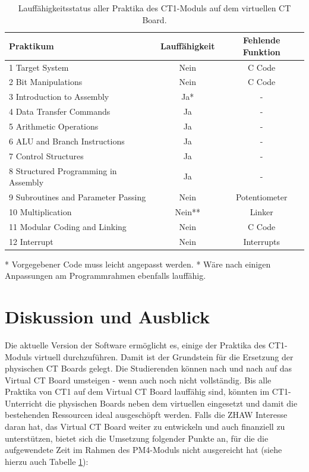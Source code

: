 \documentclass[10pt]{article}
\begin{document}
\begin{table}[ht]
\begin{tabular}{ | l | c | c |}
	\hline
    \textbf{Praktikum} & \textbf{Lauffähigkeit} & \textbf{Fehlende Funktion} \\
	\hline
    1 Target System & Nein & C Code \\
	\hline
    2 Bit Manipulations & Nein & C Code \\
\hline
    3 Introduction to Assembly & Ja* & - \\
\hline
    4 Data Transfer Commands & Ja & - \\
\hline
    5 Arithmetic Operations & Ja & - \\
\hline
    6 ALU and Branch Instructions & Ja & - \\
\hline
    7 Control Structures & Ja & - \\
\hline
    8 Structured Programming in Assembly & Ja & - \\
\hline
    9 Subroutines and Parameter Passing & Nein & Potentiometer \\
\hline
    10 Multiplication & Nein** & Linker \\
\hline
    11 Modular Coding and Linking & Nein & C Code \\
\hline
    12 Interrupt & Nein & Interrupts \\
\hline
\end{tabular}
* Vorgegebener Code muss leicht angepasst werden.
\newline** Wäre nach einigen Anpassungen am Programmrahmen ebenfalls lauffähig.
\caption[size=8pt]{Lauffähigkeitsstatus aller Praktika des CT1-Moduls auf dem virtuellen CT Board.}
\label{praktika}
\end{table}

\section{Diskussion und Ausblick}

Die aktuelle Version der Software ermöglicht es, einige der Praktika des CT1-Moduls virtuell durchzuführen. Damit ist der Grundstein für die Ersetzung der physischen CT Boards gelegt. Die Studierenden können nach und nach auf das \glqq Virtual CT Board\grqq{} umsteigen - wenn auch noch nicht vollständig. Bis alle Praktika von CT1 auf dem \glqq Virtual CT Board\grqq{} lauffähig sind, könnten im CT1-Unterricht die physischen Boards neben dem virtuellen eingesetzt und damit die bestehenden Ressourcen ideal ausgeschöpft werden. Falls die ZHAW Interesse daran hat, das \glqq Virtual CT Board\grqq{} weiter zu entwickeln und auch finanziell zu unterstützen, bietet sich die Umsetzung folgender Punkte an, für die die aufgewendete Zeit im Rahmen des PM4-Moduls nicht ausgereicht hat (siehe hierzu auch Tabelle \ref{praktika}):
\end{document}
